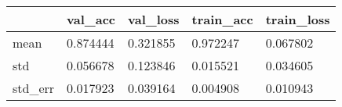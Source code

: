 \begin{tabular}{|l|l|l|l|l|}
\toprule \hline
 & val\_acc & val\_loss & train\_acc & train\_loss \\ \hline
\midrule
mean & 0.874444 & 0.321855 & 0.972247 & 0.067802 \\ \hline
std & 0.056678 & 0.123846 & 0.015521 & 0.034605 \\ \hline
std\_err & 0.017923 & 0.039164 & 0.004908 & 0.010943 \\ \hline
\bottomrule
\end{tabular}
